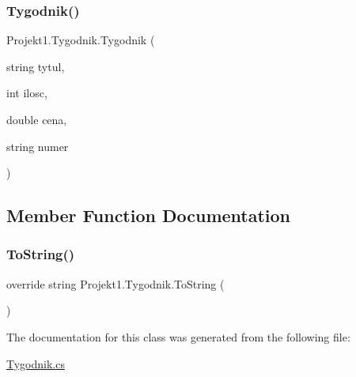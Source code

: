 \subsubsection{\texorpdfstring{Tygodnik()}{Tygodnik()}}
{\footnotesize\ttfamily Projekt1.\+Tygodnik.\+Tygodnik (\begin{DoxyParamCaption}\item[{string}]{tytul,  }\item[{int}]{ilosc,  }\item[{double}]{cena,  }\item[{string}]{numer }\end{DoxyParamCaption})}



\subsection{Member Function Documentation}
\mbox{\label{class_projekt1_1_1_tygodnik_aba6183aedf07444742b276d42c3e91a7}} 
\subsubsection{\texorpdfstring{ToString()}{ToString()}}
{\footnotesize\ttfamily override string Projekt1.\+Tygodnik.\+To\+String (\begin{DoxyParamCaption}{ }\end{DoxyParamCaption})}



The documentation for this class was generated from the following file\+:\begin{DoxyCompactItemize}
\item 
\mbox{\hyperlink{_tygodnik_8cs}{Tygodnik.\+cs}}\end{DoxyCompactItemize}
